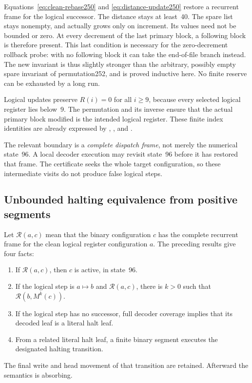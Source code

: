 Equations~\eqref{eq:clean-rebase250} and
\eqref{eq:distance-update250} restore a recurrent frame for the
logical successor.  The distance stays at least~40.  The spare list
stays nonempty, and actually grows only on increment.  Its values
need not be bounded or zero.  At every decrement of the last
primary block, a following block is therefore present.  This last
condition is necessary for the zero-decrement rollback probe: with
no following block it can take the end-of-file branch instead.
The new invariant is thus slightly stronger than the arbitrary,
possibly empty spare invariant of permutation252, and is proved
inductive here.  No finite reserve can be exhausted by a long run.

Logical updates preserve $R(i)=0$ for all $i\ge9$, because every
selected logical register lies below~9.  The permutation and its
inverse ensure that the actual primary block modified is the
intended logical register.  These finite index identities are
already expressed by ,
, and .

The relevant boundary is a \emph{complete dispatch frame}, not merely
the numerical state~96.  A local decoder execution may revisit
state~96 before it has restored that frame.  The certificate seeks
the whole target configuration, so these intermediate visits do
not produce false logical steps.

\subsection{Unbounded halting equivalence from positive segments}

Let $\mathcal R(a,c)$ mean that the binary configuration $c$ has the
complete recurrent frame for the clean logical register
configuration $a$.  The preceding results give four facts:
\begin{enumerate}
\item If $\mathcal R(a,c)$, then $c$ is active, in state~96.
\item If the logical step is $a\mapsto b$ and $\mathcal R(a,c)$,
there is $k>0$ such that $\mathcal R(b,M^k(c))$.
\item If the logical step has no successor, full decoder coverage
implies that its decoded leaf is a literal halt leaf.
\item From a related literal halt leaf, a finite binary segment
executes the designated halting transition.
\end{enumerate}
The final write and head movement of that transition are retained.
Afterward the semantics is absorbing.

